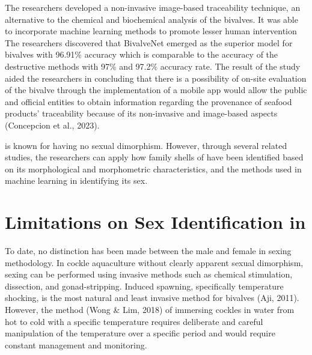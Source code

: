 The researchers developed a non-invasive image-based traceability technique, an alternative to the chemical and biochemical analysis of the bivalves. It was able to incorporate machine learning methods to promote lesser human intervention The researchers discovered that BivalveNet emerged as the superior model for bivalves with 96.91\% accuracy which is comparable to the accuracy of the destructive methods with 97\% and 97.2\% accuracy rate. The result of the study aided the researchers in concluding that there is a possibility of on-site evaluation of the bivalve through the implementation of a mobile app would allow the public and official entities to obtain information regarding the provenance of seafood products’ traceability because of its non-invasive and image-based aspects (Concepcion et al., 2023).


\Tegillarcagranosa is known for having no sexual dimorphism. However, through several related studies, the researchers can apply how family shells of \Tegillarcagranosa have been identified based on its morphological and morphometric characteristics, and the methods used in machine learning in identifying its sex. 

\section{Limitations on Sex Identification in \Tegillarcagranosa}
To date, no distinction has been made between the male and female \Tgranosa in sexing methodology. In cockle aquaculture without clearly apparent sexual dimorphism, sexing can be performed using invasive methods such as chemical stimulation, dissection, and gonad-stripping. Induced spawning, specifically temperature shocking, is the most natural and least invasive method for bivalves (Aji, 2011). However, the method (Wong \& Lim, 2018) of immersing cockles in water from hot to cold with a specific temperature requires deliberate and careful manipulation of the temperature over a specific period and would require constant management and monitoring.

